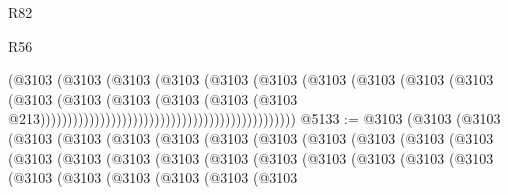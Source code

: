 \begin{lexlean}{R82}
\begin{lexlean}{R56}
\begin{coremodule}
{{{{{{{{{{{{{{{{{{{{{{{{{{{{{{{{{{{{{{{{{{{{{{{{{{{{{{{{{{{{{{{{{{{{{{{{{{{{{{{{{{{{{{{{{{{{{{{{{{{{{{{{{{{{{{{{{{{{{{{{{{{{{{{{{{{{{{{{{{{{{{{{{{{{{{{{{{{{{{{{{{{{{{{{{{{{{{{{{{{{{{{{{{{{{{{{{{{{{{{{{{{{{{{{{{{                                                                  (@3103
                                                                    (@3103
                                                                      (@3103
                                                                        (@3103
                                                                          (@3103
                                                                            (@3103
                                                                              (@3103
                                                                                (@3103
                                                                                  (@3103
                                                                                    (@3103
                                                                                      (@3103
                                                                                        (@3103
                                                                                          (@3103
                                                                                            (@3103
                                                                                              (@3103
                                                                                                (@3103
                                                                                                  @213)))))))))))))))))))))))))))))))))))))))))))))))
@5133 := @3103
    (@3103
      (@3103
        (@3103
          (@3103
            (@3103
              (@3103
                (@3103
                  (@3103
                    (@3103
                      (@3103
                        (@3103
                          (@3103
                            (@3103
                              (@3103
                                (@3103
                                  (@3103
                                    (@3103
                                      (@3103
                                        (@3103
                                          (@3103
                                            (@3103
                                              (@3103
                                                (@3103
                                                  (@3103
                                                    (@3103
                                                      (@3103
                                                        (@3103
                                                          (@3103
}}}}}}}}}}}}}}}}}}}}}}}}}}}}}}}}}}}}}}}}}}}}}}}}}}}}}}}}}}}}}}}}}}}}}}}}}}}}}}}}}}}}}}}}}}}}}}}}}}}}}}}}}}}}}}}}}}}}}}}}}}}}}}}}}}}}}}}}}}}}}}}}}}}}}}}}}}}}}}}}}}}}}}}}}}}}}}}}}}}}}}}}}}}}}}}}}}}}}}}}}}}}}}}}}}}
\end{coremodule}
\end{lexlean}
\end{lexlean}
